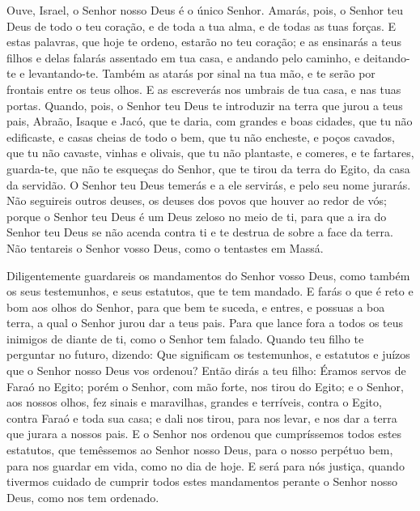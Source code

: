 Ouve, Israel, o Senhor nosso Deus é o único Senhor. Amarás,
pois, o Senhor teu Deus de todo o teu coração, e de toda a tua alma,
e de todas as tuas forças. E estas palavras, que hoje te ordeno,
estarão no teu coração; e as ensinarás a teus filhos e delas
falarás assentado em tua casa, e andando pelo caminho, e deitando-te
e levantando-te. Também as atarás por sinal na tua mão, e te
serão por frontais entre os teus olhos. E as escreverás nos
umbrais de tua casa, e nas tuas portas. Quando, pois, o
Senhor teu Deus te introduzir na terra que jurou a teus pais,
Abraão, Isaque e Jacó, que te daria, com grandes e boas cidades, que
tu não edificaste, e casas cheias de todo o bem, que tu não
encheste, e poços cavados, que tu não cavaste, vinhas e olivais, que
tu não plantaste, e comeres, e te fartares, guarda-te, que
não te esqueças do Senhor, que te tirou da terra do Egito, da casa
da servidão. O Senhor teu Deus temerás e a ele servirás, e
pelo seu nome jurarás. Não seguireis outros deuses, os deuses
dos povos que houver ao redor de vós; porque o Senhor teu
Deus é um Deus zeloso no meio de ti, para que a ira do Senhor teu
Deus se não acenda contra ti e te destrua de sobre a face da terra.
Não tentareis o Senhor vosso Deus, como o tentastes em Massá.

Diligentemente guardareis os mandamentos do Senhor vosso Deus,
como também os seus testemunhos, e seus estatutos, que te tem
mandado. E farás o que é reto e bom aos olhos do Senhor, para
que bem te suceda, e entres, e possuas a boa terra, a qual o Senhor
jurou dar a teus pais. Para que lance fora a todos os teus
inimigos de diante de ti, como o Senhor tem falado. Quando
teu filho te perguntar no futuro, dizendo: Que significam os
testemunhos, e estatutos e juízos que o Senhor nosso Deus vos
ordenou? Então dirás a teu filho: Éramos servos de Faraó no
Egito; porém o Senhor, com mão forte, nos tirou do Egito; e o
Senhor, aos nossos olhos, fez sinais e maravilhas, grandes e
terríveis, contra o Egito, contra Faraó e toda sua casa; e
dali nos tirou, para nos levar, e nos dar a terra que jurara a
nossos pais. E o Senhor nos ordenou que cumpríssemos todos
estes estatutos, que temêssemos ao Senhor nosso Deus, para o nosso
perpétuo bem, para nos guardar em vida, como no dia de hoje.
E será para nós justiça, quando tivermos cuidado de cumprir
todos estes mandamentos perante o Senhor nosso Deus, como nos tem
ordenado.

\medskip

